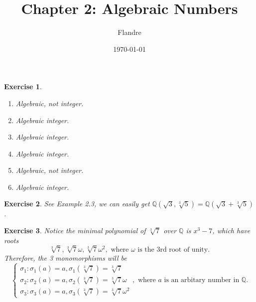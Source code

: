 \documentclass{article}
\title{Chapter 2: Algebraic Numbers}
\author{Flandre}
\date{\today}
\theoremstyle{breakstyle}
\newtheorem{exercise}{Exercise}[section]
\begin{document}
\maketitle

\setcounter{section}{2}

\begin{exercise}
    \leavevmode \vspace{-\baselineskip}
    \begin{enumerate}[label=\alph*)]
        \item Algebraic, not integer.
        \item Algebraic integer.
        \item Algebraic integer.
        \item Algebraic integer.
        \item Algebraic, not integer.
        \item Algebraic integer.
    \end{enumerate}
\end{exercise}

\begin{exercise}
    See \emph{Example 2.3}, we can easily get $\mathbb{Q}(\sqrt{3}, \sqrt[3]{5}) = \mathbb{Q}(\sqrt{3} + \sqrt[3]{5})$.
\end{exercise}

\begin{exercise}
    Notice the minimal polynomial of $\sqrt[3]{7}$ over $\mathbb{Q}$ is $x^3 - 7$, which have roots
    \[ 
        \sqrt[3]{7}, \sqrt[3]{7}\omega, \sqrt[3]{7}\omega^2, \text{ where } \omega \text{ is the } 3\text{rd root of unity}. 
    \]
    Therefore, the 3 monomorphisms will be
    \[ 
        \begin{cases}
            \sigma_1 : \sigma_1(a) = a, \sigma_1(\sqrt[3]{7}) = \sqrt[3]{7} \\
            \sigma_2 : \sigma_2(a) = a, \sigma_2(\sqrt[3]{7}) = \sqrt[3]{7}\omega \\
            \sigma_3 : \sigma_3(a) = a, \sigma_3(\sqrt[3]{7}) = \sqrt[3]{7}\omega^2
        \end{cases}, \text{ where } a \text{ is an arbitary number in } \mathbb{Q}.
    \]
\end{exercise}
\end{document}
